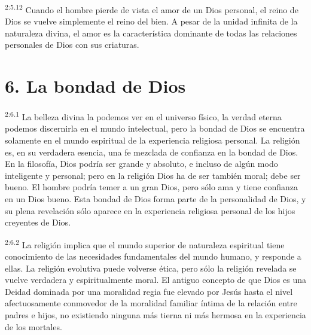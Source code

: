 \par
\textsuperscript{2:5.12} Cuando el hombre pierde de vista el amor de un Dios personal, el reino de Dios se vuelve simplemente el reino del bien. A pesar de la unidad infinita de la naturaleza divina, el amor es la característica dominante de todas las relaciones personales de Dios con sus criaturas.

\section*{6. La bondad de Dios}
\par
\textsuperscript{2:6.1} La belleza divina la podemos ver en el universo físico, la verdad eterna podemos discernirla en el mundo intelectual, pero la bondad de Dios se encuentra solamente en el mundo espiritual de la experiencia religiosa personal. La religión es, en su verdadera esencia, una fe mezclada de confianza en la bondad de Dios. En la filosofía, Dios podría ser grande y absoluto, e incluso de algún modo inteligente y personal; pero en la religión Dios ha de ser también moral; debe ser bueno. El hombre podría temer a un gran Dios, pero sólo ama y tiene confianza en un Dios bueno. Esta bondad de Dios forma parte de la personalidad de Dios, y su plena revelación sólo aparece en la experiencia religiosa personal de los hijos creyentes de Dios.

\par
\textsuperscript{2:6.2} La religión implica que el mundo superior de naturaleza espiritual tiene conocimiento de las necesidades fundamentales del mundo humano, y responde a ellas. La religión evolutiva puede volverse ética, pero sólo la religión revelada se vuelve verdadera y espiritualmente moral. El antiguo concepto de que Dios es una Deidad dominada por una moralidad regia fue elevado por Jesús hasta el nivel afectuosamente conmovedor de la moralidad familiar íntima de la relación entre padres e hijos, no existiendo ninguna más tierna ni más hermosa en la experiencia de los mortales.

